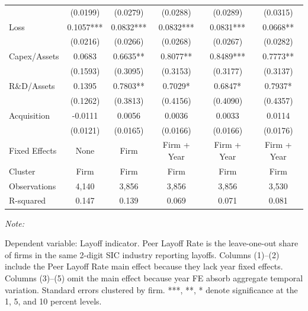 \documentclass[
  10pt,
]{article}
\begin{document}
\begin{table}[!h]
{\begin{threeparttable}
\begin{tabular}[t]{lccccc}
 & (0.0199) & (0.0279) & (0.0288) & (0.0289) & (0.0315)\\
Loss & 0.1057*** & 0.0832*** & 0.0832*** & 0.0831*** & 0.0668**\\
\addlinespace
 & (0.0216) & (0.0266) & (0.0268) & (0.0267) & (0.0282)\\
Capex/Assets & 0.0683 & 0.6635** & 0.8077** & 0.8489*** & 0.7773**\\
 & (0.1593) & (0.3095) & (0.3153) & (0.3177) & (0.3137)\\
R\&D/Assets & 0.1395 & 0.7803** & 0.7029* & 0.6847* & 0.7937*\\
 & (0.1262) & (0.3813) & (0.4156) & (0.4090) & (0.4357)\\
\addlinespace
Acquisition & -0.0111 & 0.0056 & 0.0036 & 0.0033 & 0.0114\\
 & (0.0121) & (0.0165) & (0.0166) & (0.0166) & (0.0176)\\
\midrule
Fixed Effects & None & Firm & Firm + Year & Firm + Year & Firm + Year\\
Cluster & Firm & Firm & Firm & Firm & Firm\\
Observations & 4,140 & 3,856 & 3,856 & 3,856 & 3,530\\
\addlinespace
R-squared & 0.147 & 0.139 & 0.069 & 0.071 & 0.081\\
\bottomrule
\end{tabular}
\begin{tablenotes}[para]
\item \textit{Note: } 
\item Dependent variable: Layoff indicator. Peer Layoff Rate is the leave-one-out share of firms in the same 2-digit SIC industry reporting layoffs. Columns (1)--(2) include the Peer Layoff Rate main effect because they lack year fixed effects. Columns (3)--(5) omit the main effect because year FE absorb aggregate temporal variation. Standard errors clustered by firm. ***, **, * denote significance at the 1, 5, and 10 percent levels.
\end{tablenotes}
\end{threeparttable}}
\end{table}
\end{document}
